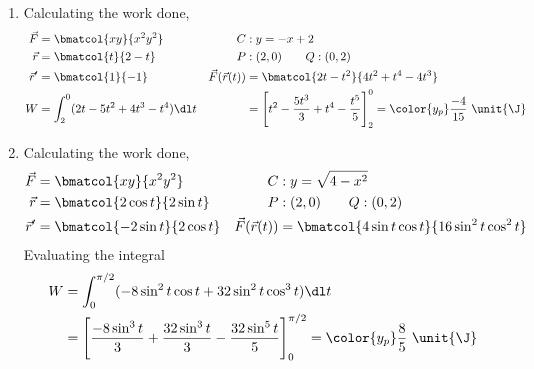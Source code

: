 \begin{enumerate}
    \item Calculating the work done,
          \begin{align}
              \vec{F}             & = \bmatcol{xy}{x^2 y^2}                       &
              C                   & : y = -x + 2                                    \\
              \vec{r}             & = \bmatcol{t}{2-t}                            &
              P                   & : (2, 0) \qquad Q : (0, 2)                      \\
              \vec{r}'            & = \bmatcol{1}{-1}                             &
              \vec{F}(\vec{r}(t)) & = \bmatcol{2t - t^2}{4t^2 + t^4 - 4t^3}         \\
              W                   & = \int_{2}^{0} (2t - 5t^2 + 4t^3 - t^4) \dl t &
                                  & = \Bigg[ t^2 - \frac{5t^3}{3}
                  + t^4 - \frac{t^5}{5} \Bigg]_2^0
              = \color{y_p} \frac{-4}{15}\ \unit{\J}
          \end{align}

    \item Calculating the work done,
          \begin{align}
              \vec{F}             & = \bmatcol{xy}{x^2 y^2}                         &
              C                   & : y = \sqrt{4 - x^2}                              \\
              \vec{r}             & = \bmatcol{2 \cos t}{2 \sin t}                  &
              P                   & : (2, 0) \qquad Q : (0, 2)                        \\
              \vec{r}'            & = \bmatcol{-2\sin t}{2 \cos t}                  &
              \vec{F}(\vec{r}(t)) & = \bmatcol{4\sin t \cos t}{16\sin^2 t \cos^2 t}
          \end{align}
          Evaluating the integral
          \begin{align}
              W & = \int_{0}^{\pi/2} (-8\sin^2 t \cos t
              + 32 \sin^2 t \cos^3 t) \dl t                              \\
                & = \Bigg[ \frac{-8\sin^3 t}{3} + \frac{32\sin^3 t}{3} -
                  \frac{32\sin^5 t}{5} \Bigg]_0^{\pi/2}
              = \color{y_p} \frac{8}{5}\ \unit{\J}
          \end{align}


\end{enumerate}
